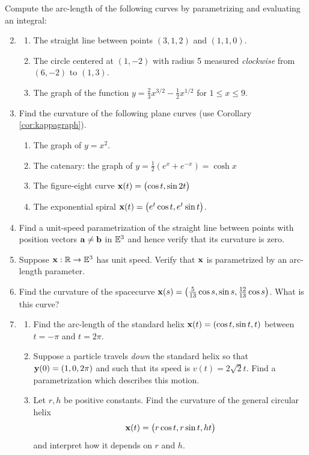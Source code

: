 \begin{exercises}
	\exstart Compute the arc-length of the following curves by parametrizing and evaluating an integral:\vspace{-5pt}
	
	\begin{enumerate}\setcounter{enumi}{1}
	  \item[]\begin{enumerate}
	    \item The straight line between points $(3,1,2)$ and $(1,1,0)$.
	    \item The circle centered at $(1,-2)$ with radius 5 measured \emph{clockwise} from $(6,-2)$ to $(1,3)$.
	    \item The graph of the function $y=\frac 23x^{3/2}-\frac 12x^{1/2}$ for $1\le x\le 9$.
	  \end{enumerate}
	  
	  \item Find the curvature of the following plane curves (use Corollary \ref{cor:kappagraph}).
	  \begin{enumerate}
	    \item The graph of $y=x^2$.
	    \item The catenary: the graph of $y=\frac 12(e^x+e^{-x})=\cosh x$
	    \item The figure-eight curve ${\mathbf{x}}(t)=\bigl(\cos t,\sin 2t\bigr)$
	    \item\label{exs:expspiral} The exponential spiral ${\mathbf{x}}(t)=\bigl(e^t\cos t,e^t\sin t\bigr)$.
	  \end{enumerate}
	  
	  \item Find a unit-speed parametrization of the straight line between points with position vectors ${\mathbf{a}}\neq {\mathbf{b}}$ in $\mathbb{E}^3$ and hence verify that its curvature is zero.
	  	
		\item Suppose ${\mathbf{x}}:\mathbb{R}\to\mathbb{E}^3$ has unit speed. Verify that ${\mathbf{x}}$ is parametrized by an arc-length parameter.
	
	  \item Find the curvature of the spacecurve ${\mathbf{x}}(s)=\left(\frac 5{13}\cos s,\sin s,\frac{12}{13}\cos s\right)$. What is this curve?
	  
	  \item\begin{enumerate}
			\item Find the arc-length of the standard helix ${\mathbf{x}}(t)=\left(\cos t,\sin t,t\right)$ between $t=-\pi$ and $t=2\pi$.
			\item Suppose a particle travels \emph{down} the standard helix so that ${\mathbf{y}}(0)=(1,0,2\pi)$ and such that its speed is $v(t)=2\sqrt{2}t$. Find a parametrization which describes this motion.
			\item Let $r,h$ be positive constants. Find the curvature of the general circular helix
			\[
				{\mathbf{x}}(t)=\bigl(r\cos t,r\sin t,ht\bigr)
			\]
			and interpret how it depends on $r$ and $h$.
	\end{enumerate}
	

\end{enumerate}
\end{exercises}
